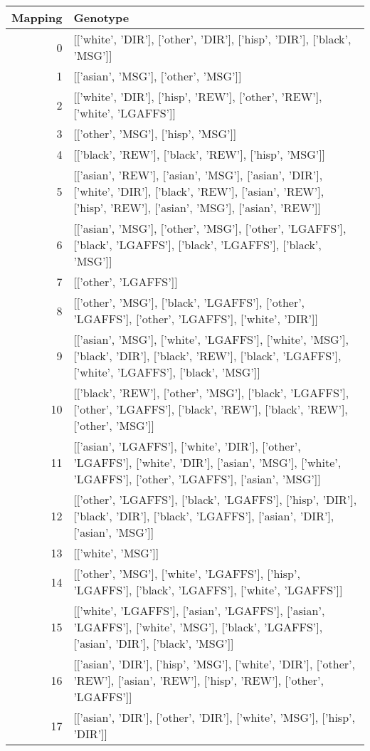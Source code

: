 \begin{tabular}{rl}
\toprule
Mapping & Genotype \\
\midrule
0 & [['white', 'DIR'], ['other', 'DIR'], ['hisp', 'DIR'], ['black', 'MSG']] \\
1 & [['asian', 'MSG'], ['other', 'MSG']] \\
2 & [['white', 'DIR'], ['hisp', 'REW'], ['other', 'REW'], ['white', 'LGAFFS']] \\
3 & [['other', 'MSG'], ['hisp', 'MSG']] \\
4 & [['black', 'REW'], ['black', 'REW'], ['hisp', 'MSG']] \\
5 & [['asian', 'REW'], ['asian', 'MSG'], ['asian', 'DIR'], ['white', 'DIR'], ['black', 'REW'], ['asian', 'REW'], ['hisp', 'REW'], ['asian', 'MSG'], ['asian', 'REW']] \\
6 & [['asian', 'MSG'], ['other', 'MSG'], ['other', 'LGAFFS'], ['black', 'LGAFFS'], ['black', 'LGAFFS'], ['black', 'MSG']] \\
7 & [['other', 'LGAFFS']] \\
8 & [['other', 'MSG'], ['black', 'LGAFFS'], ['other', 'LGAFFS'], ['other', 'LGAFFS'], ['white', 'DIR']] \\
9 & [['asian', 'MSG'], ['white', 'LGAFFS'], ['white', 'MSG'], ['black', 'DIR'], ['black', 'REW'], ['black', 'LGAFFS'], ['white', 'LGAFFS'], ['black', 'MSG']] \\
10 & [['black', 'REW'], ['other', 'MSG'], ['black', 'LGAFFS'], ['other', 'LGAFFS'], ['black', 'REW'], ['black', 'REW'], ['other', 'MSG']] \\
11 & [['asian', 'LGAFFS'], ['white', 'DIR'], ['other', 'LGAFFS'], ['white', 'DIR'], ['asian', 'MSG'], ['white', 'LGAFFS'], ['other', 'LGAFFS'], ['asian', 'MSG']] \\
12 & [['other', 'LGAFFS'], ['black', 'LGAFFS'], ['hisp', 'DIR'], ['black', 'DIR'], ['black', 'LGAFFS'], ['asian', 'DIR'], ['asian', 'MSG']] \\
13 & [['white', 'MSG']] \\
14 & [['other', 'MSG'], ['white', 'LGAFFS'], ['hisp', 'LGAFFS'], ['black', 'LGAFFS'], ['white', 'LGAFFS']] \\
15 & [['white', 'LGAFFS'], ['asian', 'LGAFFS'], ['asian', 'LGAFFS'], ['white', 'MSG'], ['black', 'LGAFFS'], ['asian', 'DIR'], ['black', 'MSG']] \\
16 & [['asian', 'DIR'], ['hisp', 'MSG'], ['white', 'DIR'], ['other', 'REW'], ['asian', 'REW'], ['hisp', 'REW'], ['other', 'LGAFFS']] \\
17 & [['asian', 'DIR'], ['other', 'DIR'], ['white', 'MSG'], ['hisp', 'DIR']] \\

\end{tabular}
